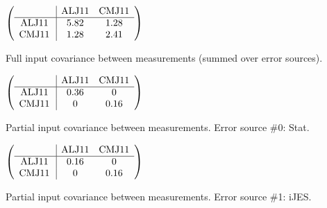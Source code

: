 \begin{table}[H]
\scriptsize
\begin{center}
\renewcommand{\arraystretch}{1.1}
\begin{math}\left(\begin{array}{c|cc}
 & \mathrm{ALJ11} & 
\mathrm{CMJ11} \\
\hline
\mathrm{ALJ11} \hspace*{2pt} &       5.82 &       1.28 \\
\mathrm{CMJ11} \hspace*{2pt} &       1.28 &       2.41 \\
\end{array}\right)\end{math}
\caption{Full input covariance between measurements (summed over error sources).}
\renewcommand{\arraystretch}{1}
\end{center}
\end{table}
\begin{table}[H]
\scriptsize
\begin{center}
\renewcommand{\arraystretch}{1.1}
\begin{math}\left(\begin{array}{c|cc}
 & \mathrm{ALJ11} & 
\mathrm{CMJ11} \\
\hline
\mathrm{ALJ11} \hspace*{2pt} &       0.36 &  0 \\
\mathrm{CMJ11} \hspace*{2pt} &  0 &       0.16 \\
\end{array}\right)\end{math}
\caption{Partial input covariance between measurements. Error source \#0: Stat.}
\renewcommand{\arraystretch}{1}
\end{center}
\end{table}
\begin{table}[H]
\scriptsize
\begin{center}
\renewcommand{\arraystretch}{1.1}
\begin{math}\left(\begin{array}{c|cc}
 & \mathrm{ALJ11} & 
\mathrm{CMJ11} \\
\hline
\mathrm{ALJ11} \hspace*{2pt} &       0.16 &  0 \\
\mathrm{CMJ11} \hspace*{2pt} &  0 &       0.16 \\
\end{array}\right)\end{math}
\caption{Partial input covariance between measurements. Error source \#1: iJES.}
\renewcommand{\arraystretch}{1}
\end{center}
\end{table}
